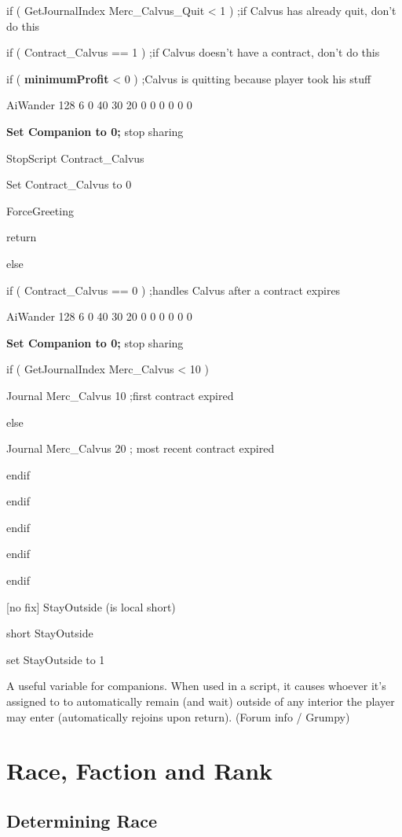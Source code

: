 
if ( GetJournalIndex Merc\_Calvus\_Quit < 1 ) ;if Calvus has
already quit, don't do this

if ( Contract\_Calvus == 1 ) ;if Calvus doesn't have a contract, don't
do this

if ( \textbf{minimumProfit} < 0 ) ;Calvus is quitting because
player took his stuff

AiWander 128 6 0 40 30 20 0 0 0 0 0 0

\textbf{Set Companion to 0;} stop sharing

StopScript Contract\_Calvus

Set Contract\_Calvus to 0

ForceGreeting

return

else

if ( Contract\_Calvus == 0 ) ;handles Calvus after a contract expires

AiWander 128 6 0 40 30 20 0 0 0 0 0 0

\textbf{Set Companion to 0;} stop sharing

if ( GetJournalIndex Merc\_Calvus < 10 )

Journal Merc\_Calvus 10 ;first contract expired

else

Journal Merc\_Calvus 20 ; most recent contract expired

endif

endif

endif

endif

endif

{[}no fix{]} StayOutside (is local short)

short StayOutside

set StayOutside to 1

A useful variable for companions. When used in a script, it causes
whoever it's assigned to to automatically remain (and wait) outside of
any interior the player may enter (automatically rejoins upon return).
(Forum info / Grumpy)

\hypertarget{race-faction-and-rank}{%
\section{\texorpdfstring{\hfill\break
Race, Faction and
Rank}{ Race, Faction and Rank}}\label{race-faction-and-rank}}

\hypertarget{determining-race}{%
\subsection{Determining Race}\label{determining-race}}

